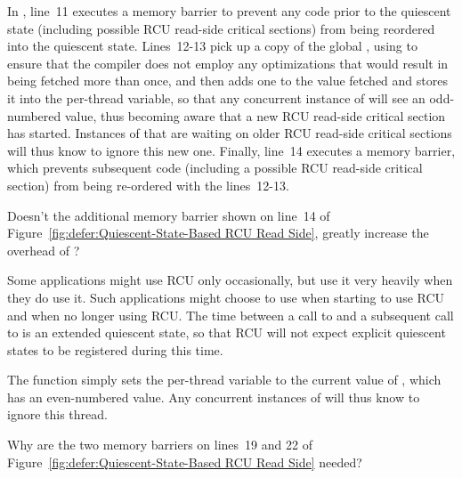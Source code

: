 In , line~11 executes a memory barrier
to prevent any code prior to the quiescent state (including possible
RCU read-side critical sections) from being reordered
into the quiescent state.
Lines~12-13 pick up a copy of the global , using
 to ensure that the compiler does not employ any
optimizations that would result in  being fetched
more than once,
and then adds one to the value fetched and stores it into
the per-thread  variable, so that any concurrent
instance of  will see an odd-numbered value,
thus becoming aware that a new RCU read-side critical section has started.
Instances of  that are waiting on older
RCU read-side critical sections will thus know to ignore this new one.
Finally, line~14 executes a memory barrier, which prevents subsequent
code (including a possible RCU read-side critical section) from being
re-ordered with the lines~12-13.

\QuickQuiz{}
	Doesn't the additional memory barrier shown on line~14 of
	Figure~\ref{fig:defer:Quiescent-State-Based RCU Read Side},
	greatly increase the overhead of ?
 \QuickQuizEnd

Some applications might use RCU only occasionally, but use it very heavily
when they do use it.
Such applications might choose to use  when
starting to use RCU and  when no longer
using RCU.
The time between a call to  and a subsequent
call to  is an extended quiescent state,
so that RCU will not expect explicit quiescent states to be registered
during this time.

The  function simply sets the
per-thread  variable to the current value of
, which has an even-numbered value.
Any concurrent instances of  will thus know to
ignore this thread.

\QuickQuiz{}
	Why are the two memory barriers on lines~19 and 22 of
	Figure~\ref{fig:defer:Quiescent-State-Based RCU Read Side}
	needed?
 \QuickQuizEnd

